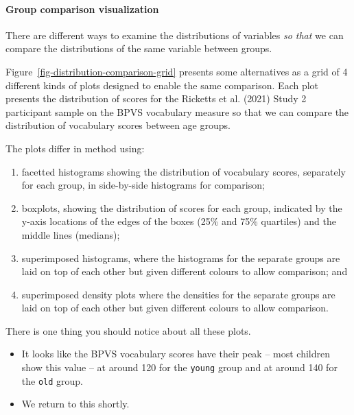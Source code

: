 \documentclass[
  letterpaper,
  DIV=11,
  numbers=noendperiod]{scrreprt}
\let\oldparagraph\paragraph
\renewcommand{\paragraph}[1]{\oldparagraph{#1}\mbox{}}
\providecommand{\tightlist}{%
  \setlength{\itemsep}{0pt}\setlength{\parskip}{0pt}}\usepackage{longtable,booktabs,array}
\begin{document}
\hypertarget{sec-group-compare-distribution}{%
\paragraph{Group comparison
visualization}\label{sec-group-compare-distribution}}

There are different ways to examine the distributions of variables
\emph{so that} we can compare the distributions of the same variable
between groups.

Figure~\ref{fig-distribution-comparison-grid} presents some alternatives
as a grid of 4 different kinds of plots designed to enable the same
comparison. Each plot presents the distribution of scores for the
Ricketts et al. (2021) Study 2 participant sample on the BPVS vocabulary
measure so that we can compare the distribution of vocabulary scores
between age groups.

The plots differ in method using:

\begin{enumerate}
\def\labelenumi{\alph{enumi}.}
\tightlist
\item
  facetted histograms showing the distribution of vocabulary scores,
  separately for each group, in side-by-side histograms for comparison;
\item
  boxplots, showing the distribution of scores for each group, indicated
  by the y-axis locations of the edges of the boxes (25\% and 75\%
  quartiles) and the middle lines (medians);
\item
  superimposed histograms, where the histograms for the separate groups
  are laid on top of each other but given different colours to allow
  comparison; and
\item
  superimposed density plots where the densities for the separate groups
  are laid on top of each other but given different colours to allow
  comparison.
\end{enumerate}

\begin{tcolorbox}[enhanced jigsaw, opacitybacktitle=0.6, title=\textcolor{quarto-callout-tip-color}{\faLightbulb}\hspace{0.5em}{Tip}, arc=.35mm, colbacktitle=quarto-callout-tip-color!10!white, colframe=quarto-callout-tip-color-frame, leftrule=.75mm, opacityback=0, breakable, titlerule=0mm, left=2mm, bottomrule=.15mm, toprule=.15mm, colback=white, coltitle=black, bottomtitle=1mm, toptitle=1mm, rightrule=.15mm]

There is one thing you should notice about all these plots.

\begin{itemize}
\tightlist
\item
  It looks like the BPVS vocabulary scores have their peak -- most
  children show this value -- at around 120 for the \texttt{young} group
  and at around 140 for the \texttt{old} group.\\
\item
  We return to this shortly.
\end{itemize}

\end{tcolorbox}
\end{document}

